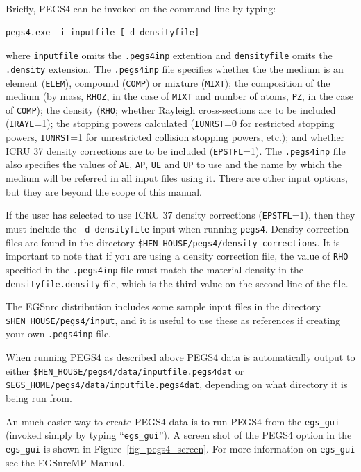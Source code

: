 \documentclass[12pt,twoside]{article}
\begin{document}
Briefly, PEGS4 can be invoked on the command line by typing:
\begin{verbatim}
pegs4.exe -i inputfile [-d densityfile]
\end{verbatim}
where {\tt inputfile} omits the {\tt .pegs4inp} extention and
{\tt densityfile} omits the {\tt .density} extension.  The {\tt .pegs4inp}
file specifies whether the the medium is an element ({\tt ELEM}),
compound ({\tt COMP}) or mixture ({\tt MIXT}); the composition of
the medium (by mass, {\tt RHOZ}, in the case of {\tt MIXT} and
number of atoms, {\tt PZ}, in the case of {\tt COMP}); the density ({\tt RHO};
whether Rayleigh cross-sections are to be included ({\tt IRAYL}=1);
the stopping powers calculated ({\tt IUNRST}=0 for restricted stopping
powers, {\tt IUNRST}=1 for unrestricted collision stopping powers, etc.);
and whether ICRU 37 density corrections are to be included
({\tt EPSTFL}=1).  The {\tt .pegs4inp} file also specifies the
values of {\tt AE}, {\tt AP}, {\tt UE} and {\tt UP} to use and the
name by which the medium will be referred in all input files using it.
There are other input options, but they are beyond the scope of this
manual.

If the user has selected to use ICRU 37 density corrections ({\tt EPSTFL}=1),
then they must include the {\tt -d densityfile} input when running
{\tt pegs4}.  Density correction files are found in the directory
{\tt \$HEN\_HOUSE/pegs4/density\_corrections}.  It is important to note that
if you are using a density correction file, the value of {\tt RHO} specified
in the {\tt .pegs4inp} file must match the material density in the
{\tt densityfile.density} file, which is the third value on the second
line of the file.

The EGSnrc distribution includes some sample input files in the
directory {\tt \$HEN\_HOUSE/pegs4/input}, and it is useful to use these
as references if creating your own {\tt .pegs4inp} file.

When running PEGS4 as described above PEGS4 data is automatically output
to either
{\tt \$HEN\_HOUSE/pegs4/data/inputfile.pegs4dat} or
{\tt \$EGS\_HOME/pegs4/data/inputfile.pegs4dat}, depending on what
directory it is being run from.

An much easier way to create PEGS4 data is to run PEGS4 from
the {\tt egs\_gui} (invoked simply by typing ``{\tt egs\_gui}'').  A screen
shot of the PEGS4 option in the {\tt egs\_gui} is shown in
Figure~\ref{fig_pegs4_screen}.  For more information on {\tt egs\_gui}
see the EGSnrcMP Manual\cite{Ka03}.
\end{document}

